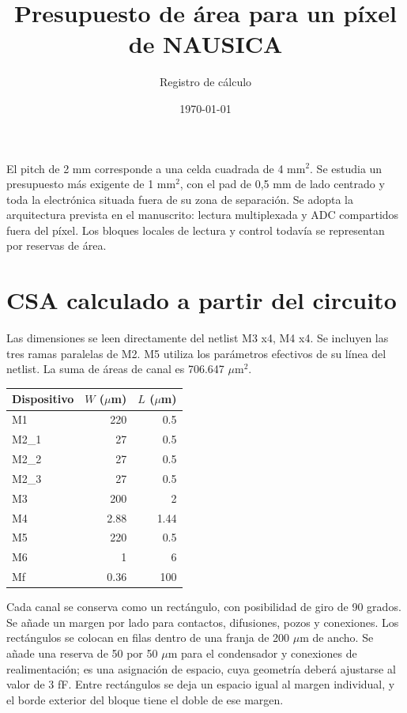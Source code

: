 \documentclass[11pt,a4paper]{article}
\title{Presupuesto de área para un píxel de NAUSICA}
\author{Registro de cálculo}\date{\today}
\begin{document}
\maketitle
El pitch de 2 mm corresponde a una celda cuadrada de 4 mm$^2$.
Se estudia un presupuesto más exigente de 1 mm$^2$, con el pad de
0,5 mm de lado centrado y toda la electrónica situada fuera de su zona de
separación. Se adopta la arquitectura prevista en el manuscrito: lectura
multiplexada y ADC compartidos fuera del píxel. Los bloques locales de lectura
y control todavía se representan por reservas de área.

\section*{CSA calculado a partir del circuito}
Las dimensiones se leen directamente del netlist M3 x4, M4 x4. Se incluyen
las tres ramas paralelas de M2. M5 utiliza los parámetros efectivos de su
línea del netlist. La suma de áreas de canal es 706.647 $\mu$m$^2$.
\begin{center}\begin{tabular}{lrr}\toprule
Dispositivo & $W$ ($\mu$m) & $L$ ($\mu$m)\\\midrule
M1 & 220 & 0.5 \\
M2\_1 & 27 & 0.5 \\
M2\_2 & 27 & 0.5 \\
M2\_3 & 27 & 0.5 \\
M3 & 200 & 2 \\
M4 & 2.88 & 1.44 \\
M5 & 220 & 0.5 \\
M6 & 1 & 6 \\
Mf & 0.36 & 100 \\
\bottomrule\end{tabular}\end{center}
Cada canal se conserva como un rectángulo, con posibilidad de giro de 90 grados.
Se añade un margen por lado para contactos, difusiones, pozos y conexiones.
Los rectángulos se colocan en filas dentro de una franja de 200 $\mu$m de ancho.
Se añade una reserva de 50 por 50 $\mu$m para el condensador y conexiones de
realimentación; es una asignación de espacio, cuya geometría deberá ajustarse
al valor de 3 fF. Entre rectángulos se deja un espacio igual al margen individual,
y el borde exterior del bloque tiene el doble de ese margen.
\end{document}
